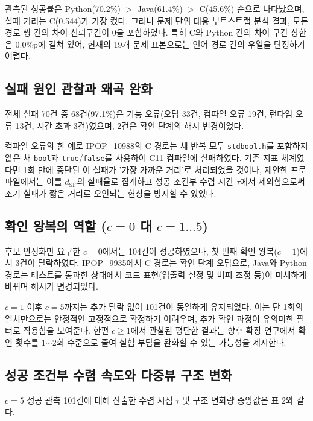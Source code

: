 \documentclass[a4paper,10pt,twocolumn,twoside]{article}
\newcommand{\dsf}{d_{\mathrm{SF}}}
\begin{document}
관측된 성공률은 Python(70.2\%) $>$ Java(61.4\%) $>$ C(45.6\%) 순으로 나타났으며, 실패 거리는 C(0.544)가 가장 컸다. 그러나 문제 단위 대응 부트스트랩 분석 결과, 모든 경로 쌍 간의 차이 신뢰구간이 0을 포함하였다. 특히 C와 Python 간의 차이 구간 상한은 0.0\%p에 걸쳐 있어, 현재의 19개 문제 표본으로는 언어 경로 간의 우열을 단정하기 어렵다.

\subsection{실패 원인 관찰과 왜곡 완화}

전체 실패 70건 중 68건(97.1\%)은 기능 오류(오답 33건, 컴파일 오류 19건, 런타임 오류 13건, 시간 초과 3건)였으며, 2건은 확인 단계의 해시 변경이었다. 

컴파일 오류의 한 예로 IPOP\_10988의 C 경로는 세 반복 모두 \texttt{stdbool.h}를 포함하지 않은 채 \texttt{bool}과 \texttt{true}/\texttt{false}를 사용하여 C11 컴파일에 실패하였다. 기존 지표 체계였다면 1회 만에 중단된 이 실패가 '가장 가까운 거리'로 처리되었을 것이나, 제안한 프로파일에서는 이를 $\dsf$의 실패율로 집계하고 성공 조건부 수렴 시간 $\tau$에서 제외함으로써 조기 실패가 짧은 거리로 오인되는 현상을 방지할 수 있었다.

\subsection{\texorpdfstring{확인 왕복의 역할 ($c=0$ 대 $c=1 \ldots 5$)}{확인 왕복의 역할 (c=0 대 c=1...5)}}

후보 안정화만 요구한 $c=0$에서는 104건이 성공하였으나, 첫 번째 확인 왕복($c=1$)에서 3건이 탈락하였다. IPOP\_9935에서 C 경로는 확인 단계 오답으로, Java와 Python 경로는 테스트를 통과한 상태에서 코드 표현(입출력 설정 및 버퍼 조정 등)이 미세하게 바뀌며 해시가 변경되었다. 

$c=1$ 이후 $c=5$까지는 추가 탈락 없이 101건이 동일하게 유지되었다. 이는 단 1회의 일치만으로는 안정적인 고정점으로 확정하기 어려우며, 추가 확인 과정이 유의미한 필터로 작용함을 보여준다. 한편 $c \geq 1$에서 관찰된 평탄한 결과는 향후 확장 연구에서 확인 횟수를 1$\sim$2회 수준으로 줄여 실험 부담을 완화할 수 있는 가능성을 제시한다.

\subsection{성공 조건부 수렴 속도와 다중뷰 구조 변화}

$c=5$ 성공 관측 101건에 대해 산출한 수렴 시점 $\tau$ 및 구조 변화량 중앙값은 표 2와 같다.
\end{document}
